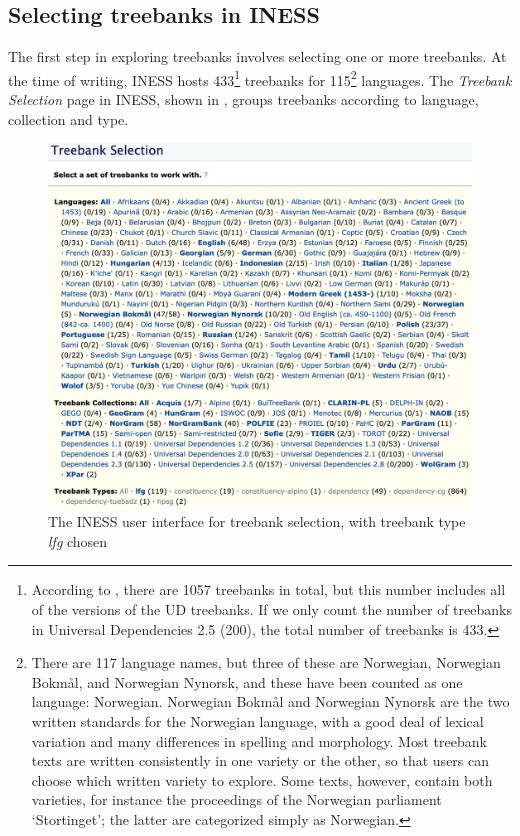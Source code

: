 \documentclass[output=paper,hidelinks]{langscibook}
\begin{document}
\subsection{Selecting treebanks in INESS}\label{select}

The first step in exploring treebanks involves selecting one or more treebanks.
At the time of writing, INESS hosts 433\footnote{According to , there are 1057 treebanks in total, but this number includes all of the versions of the UD treebanks. If we only count the number of treebanks in Universal Dependencies 2.5 (200), the total number of treebanks is 433.} treebanks for 115\footnote{There are 117 language names, but three of these are Norwegian, Norwegian Bokmål, and Norwegian Nynorsk, and these have been counted as one language: Norwegian. Norwegian Bokmål and Norwegian Nynorsk are the two written standards for the Norwegian language, with a good deal of lexical variation and many differences in spelling and morphology. Most treebank texts are written consistently in one variety or the other, so that users can choose which written variety to explore. Some texts, however, contain both varieties, for instance the proceedings of the Norwegian parliament `Stortinget'; the latter are categorized simply as Norwegian.} languages.
The \emph{Treebank Selection} page in INESS, shown in , groups treebanks according to language, collection and type.

\begin{figure}
    \includegraphics[width=\textwidth]{figures/Treebanks/LFG-choice-3.png}
    \caption{The INESS user interface for treebank selection, with treebank type \textit{lfg} chosen}
    \label{fig:choice}
\end{figure}
\end{document}
